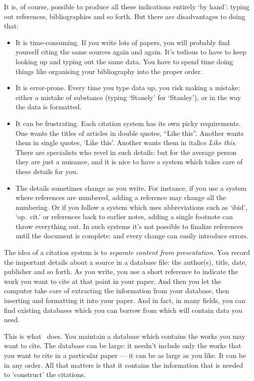 It is, of course, possible to produce all these indications entirely
`by hand': typing out references, bibliographies and so forth. But
there are disadvantages to doing that:
\begin{itemize}
\item It is time-consuming. If you write lots of papers, you will
  probably find yourself citing the same sources again and again. It's
  tedious to have to keep looking up and typing out the same data. You
  have to spend time doing things like organising your bibliography
  into the proper order.
\item It is error-prone. Every time you type data up, you risk making
  a mistake: either a mistake of substance (typing `Stanely' for
  `Stanley'), or in the way the data is formatted.
\item It can be frustrating. Each citation system has its own picky
  requirements. One wants the titles of articles in double quotes,
  ``Like this''. Another wants them in single quotes, `Like
  this'. Another wants them in italics \emph{Like this}. There are
  specialists who revel in such details: but for the average person
  they are just a nuisance, and it is nice to have a system which
  takes care of these details for you.
\item The details sometimes change as you write. For instance, if you
  use a system where references are numbered, adding a reference may
  change all the numbering. Or if you follow a system which uses
  abbreviations such as `ibid', `op.\ cit.' or references back to
  earlier notes, adding a single footnote can throw everything out. In
  such systems it's not possible to finalize references until the
  document is complete: and every change can easily introduce errors.
\end{itemize}

The idea of a citation system is to \emph{separate content from
  presentation}. You record the important details about a source in a
database file: the author(s), title, date, publisher and so forth. As
you write, you use a short reference to indicate the work you want to
cite at that point in your paper. And then you let the computer take
care of extracting the information from your database, then inserting
and formatting it into your paper. And in fact, in many fields, you
can find existing databases which you can borrow from which will
contain data you need.

This is what \biblatex\ does. You maintain a database which contains
the works you may want to cite. The database can be large: it needn't
include only the works that you want to cite in a particular paper ---
it can be as large as you like. It can be in any order. All that
matters is that it contains the information that is needed to
`construct' the citations.

